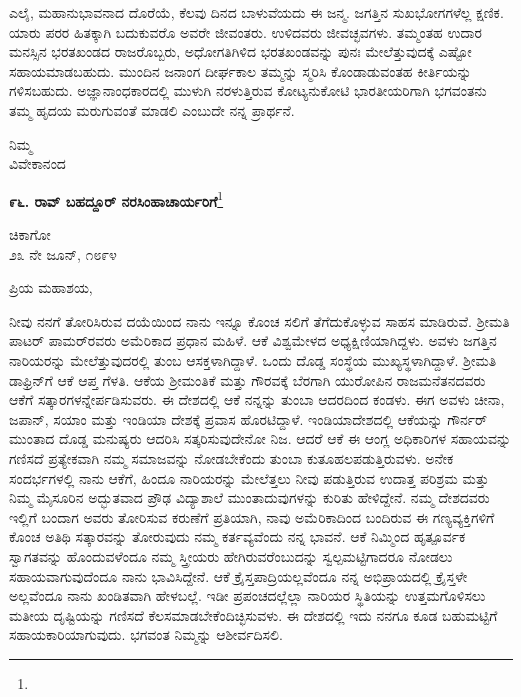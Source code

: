 ಎಲೈ, ಮಹಾನುಭಾವನಾದ ದೊರೆಯೆ, ಕೆಲವು ದಿನದ ಬಾಳುವೆಯದು ಈ ಜನ್ಮ. ಜಗತ್ತಿನ ಸುಖಭೋಗಗಳೆಲ್ಲ ಕ್ಷಣಿಕ. ಯಾರು ಪರರ ಹಿತಕ್ಕಾಗಿ ಬದುಕುವರೊ ಅವರೇ ಜೀವಂತರು. ಉಳಿದವರು ಜೀವಚ್ಛವಗಳು. ತಮ್ಮಂತಹ ಉದಾರ ಮನಸ್ಸಿನ ಭರತಖಂಡದ ರಾಜರೊಬ್ಬರು, ಅಧೋಗತಿಗಿಳಿದ ಭರತಖಂಡವನ್ನು ಪುನಃ ಮೇಲೆತ್ತುವುದಕ್ಕೆ ಎಷ್ಟೋ ಸಹಾಯಮಾಡಬಹುದು. ಮುಂದಿನ ಜನಾಂಗ ದೀರ್ಘಕಾಲ ತಮ್ಮನ್ನು ಸ್ಮರಿಸಿ ಕೊಂಡಾಡುವಂತಹ ಕೀರ್ತಿಯನ್ನು ಗಳಿಸಬಹುದು. ಅಜ್ಞಾನಾಂಧಕಾರದಲ್ಲಿ ಮುಳುಗಿ ನರಳುತ್ತಿರುವ ಕೋಟ್ಯನುಕೋಟಿ ಭಾರತೀಯರಿಗಾಗಿ ಭಗವಂತನು ತಮ್ಮ ಹೃದಯ ಮರುಗುವಂತೆ ಮಾಡಲಿ ಎಂಬುದೇ ನನ್ನ ಪ್ರಾರ್ಥನೆ.

{\flushright
ನಿಮ್ಮ\\ವಿವೇಕಾನಂದ\par}

\newpage

\begin{center}
\textbf{೯೬. ರಾವ್ ಬಹದ್ದೂರ್ ನರಸಿಂಹಾಚಾರ್ಯರಿಗೆ}\footnote{}
\end{center}

\begin{flushright}
ಚಿಕಾಗೋ\\೨೩ ನೇ ಜೂನ್, ೧೮೯೪
\end{flushright}

\noindent
ಪ್ರಿಯ ಮಹಾಶಯ,

ನೀವು ನನಗೆ ತೋರಿಸಿರುವ ದಯೆಯಿಂದ ನಾನು ಇನ್ನೂ ಕೊಂಚ ಸಲಿಗೆ ತೆಗೆದುಕೊಳ್ಳುವ ಸಾಹಸ ಮಾಡಿರುವೆ. ಶ‍್ರೀಮತಿ ಪಾಟರ್ ಪಾಮರ್‌ರವರು ಅಮೆರಿಕಾದ ಪ್ರಧಾನ ಮಹಿಳೆ. ಆಕೆ ವಿಶ್ವಮೇಳದ ಅಧ್ಯಕ್ಷಿಣಿಯಾಗಿದ್ದಳು. ಅವಳು ಜಗತ್ತಿನ ನಾರಿಯರನ್ನು ಮೇಲೆತ್ತುವುದರಲ್ಲಿ ತುಂಬ ಆಸಕ್ತಳಾಗಿದ್ದಾಳೆ. ಒಂದು ದೊಡ್ಡ ಸಂಸ್ಥೆಯ ಮುಖ್ಯ\break ಸ್ಥಳಾಗಿದ್ದಾಳೆ. ಶ‍್ರೀಮತಿ ಡಾಫ್ರಿನ್‌ಗೆ ಆಕೆ ಆಪ್ತ ಗೆಳತಿ. ಆಕೆಯ ಶ‍್ರೀಮಂತಿಕೆ ಮತ್ತು ಗೌರವಕ್ಕೆ ಬೆರಗಾಗಿ ಯುರೋಪಿನ ರಾಜಮನೆತನದವರು ಆಕೆಗೆ ಸತ್ಕಾರಗಳನ್ನೇರ್ಪಡಿಸುವರು. ಈ ದೇಶದಲ್ಲಿ ಆಕೆ ನನ್ನನ್ನು ತುಂಬಾ ಆದರದಿಂದ ಕಂಡಳು. ಈಗ ಅವಳು ಚೀನಾ, ಜಪಾನ್, ಸಯಾಂ ಮತ್ತು ಇಂಡಿಯಾ ದೇಶಕ್ಕೆ ಪ್ರವಾಸ ಹೊರಟಿದ್ದಾಳೆ. ಇಂಡಿಯಾದೇಶದಲ್ಲಿ ಆಕೆಯನ್ನು ಗೌರ್ನ‌ರ್ ಮುಂತಾದ ದೊಡ್ಡ ಮನುಷ್ಯರು ಆದರಿಸಿ ಸತ್ಕರಿಸುವುದೇನೋ ನಿಜ. ಆದರೆ ಆಕೆ ಈ ಆಂಗ್ಲ ಅಧಿಕಾರಿಗಳ ಸಹಾಯವನ್ನು ಗಣಿಸದೆ ಪ್ರತ್ಯೇಕವಾಗಿ ನಮ್ಮ ಸಮಾಜವನ್ನು ನೋಡಬೇಕೆಂದು ತುಂಬಾ ಕುತೂಹಲಪಡುತ್ತಿರುವಳು. ಅನೇಕ ಸಂದರ್ಭಗಳಲ್ಲಿ ನಾನು ಆಕೆಗೆ, ಹಿಂದೂ ನಾರಿಯರನ್ನು ಮೇಲೆತ್ತಲು ನೀವು ಪಡುತ್ತಿರುವ ಉದಾತ್ತ ಪರಿಶ್ರಮ ಮತ್ತು ನಿಮ್ಮ ಮೈಸೂರಿನ ಅದ್ಭುತವಾದ ಪ್ರೌಢ ವಿದ್ಯಾಶಾಲೆ ಮುಂತಾದುವುಗಳನ್ನು ಕುರಿತು ಹೇಳಿದ್ದೇನೆ. ನಮ್ಮ ದೇಶದವರು ಇಲ್ಲಿಗೆ ಬಂದಾಗ ಅವರು ತೋರಿಸುವ ಕರುಣೆಗೆ ಪ್ರತಿಯಾಗಿ, ನಾವು ಅಮೆರಿಕಾದಿಂದ ಬಂದಿರುವ ಈ ಗಣ್ಯವ್ಯಕ್ತಿಗಳಿಗೆ ಕೊಂಚ ಅತಿಥಿ ಸತ್ಕಾರವನ್ನು ತೋರುವುದು ನಮ್ಮ ಕರ್ತವ್ಯವೆಂದು ನನ್ನ ಭಾವನೆ. ಆಕೆ ನಿಮ್ಮಿಂದ ಹೃತ್ಪೂರ್ವಕ ಸ್ವಾಗತವನ್ನು ಹೊಂದುವಳೆಂದೂ ನಮ್ಮ ಸ್ತ್ರೀಯರು ಹೇಗಿರುವರೆಂಬುದನ್ನು ಸ್ವಲ್ಪಮಟ್ಟಿಗಾದರೂ ನೋಡಲು ಸಹಾಯವಾಗುವುದೆಂದೂ ನಾನು ಭಾವಿಸಿದ್ದೇನೆ. ಆಕೆ ಕ್ರೈಸ್ತಪಾದ್ರಿಯಲ್ಲವೆಂದೂ ನನ್ನ ಅಭಿಪ್ರಾಯದಲ್ಲಿ ಕ್ರೈಸ್ತಳೇ ಅಲ್ಲವೆಂದೂ ನಾನು ಖಂಡಿತವಾಗಿ ಹೇಳಬಲ್ಲೆ. ಇಡೀ ಪ್ರಪಂಚದಲ್ಲೆಲ್ಲಾ ನಾರಿಯರ ಸ್ಥಿತಿಯನ್ನು ಉತ್ತಮಗೊಳಿಸಲು ಮತೀಯ ದೃಷ್ಟಿಯನ್ನು ಗಣಿಸದೆ ಕೆಲಸಮಾಡಬೇಕೆಂದಿಚ್ಛಿಸುವಳು. ಈ ದೇಶದಲ್ಲಿ ಇದು ನನಗೂ ಕೂಡ ಬಹುಮಟ್ಟಿಗೆ ಸಹಾಯಕಾರಿಯಾಗುವುದು. ಭಗವಂತ ನಿಮ್ಮನ್ನು ಆಶೀರ್ವದಿಸಲಿ.

